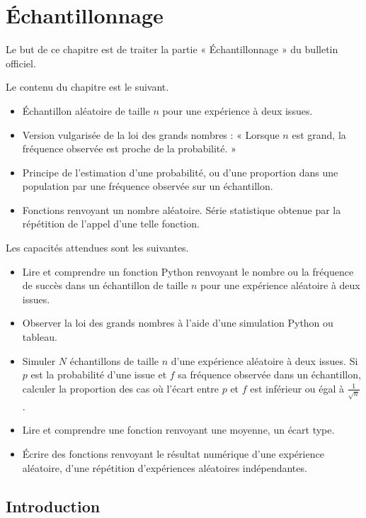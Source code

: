 
\chapter{Échantillonnage}

Le but de ce chapitre est de traiter la partie « Échantillonnage » du bulletin officiel.

Le contenu du chapitre est le suivant.
	\begin{itemize}
		\item Échantillon aléatoire de taille $n$ pour une expérience à deux issues.
		\item Version vulgarisée de la loi des grands nombres : « Lorsque $n$ est grand, la fréquence observée est proche de la probabilité. »
		\item Principe de l'estimation d'une probabilité, ou d'une proportion dans une population par une fréquence observée sur un échantillon.
		\item Fonctions renvoyant un nombre aléatoire. Série statistique obtenue par la répétition de l'appel d'une telle fonction.
	\end{itemize}

Les capacités attendues sont les suivantes.
	\begin{itemize}
		\item Lire et comprendre un fonction Python renvoyant le nombre ou la fréquence de succès dans un échantillon de taille $n$ pour une expérience aléatoire à deux issues.
		\item Observer la loi des grands nombres à l'aide d'une simulation Python ou tableau.
		\item Simuler $N$ échantillons de taille $n$ d'une expérience aléatoire à deux issues. Si $p$ est la probabilité d'une issue et $f$ sa fréquence observée dans un échantillon, calculer la proportion des cas où l'écart entre $p$ et $f$ est inférieur ou égal à $\frac1{\sqrt{n}}$.
		\item Lire et comprendre une fonction renvoyant une moyenne, un écart type.
		\item Écrire des fonctions renvoyant le résultat numérique d'une expérience aléatoire, d'une répétition d'expériences aléatoires indépendantes.
	\end{itemize}

\section{Introduction}

